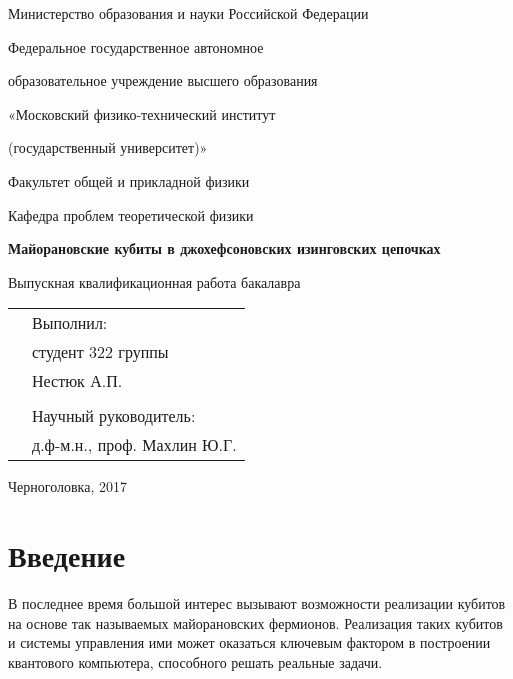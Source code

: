 \documentclass[a4paper,12pt]{article}
\author{}
\title{}
\date{\today}
\theoremstyle{plain} %
\theoremstyle{definition} %
\theoremstyle{remark} %
\begin{document}
    
\begin{titlepage}
    \begin{center}
        Министерство образования и науки Российской Федерации
        \linebreak
        
        Федеральное государственное автономное
        
        образовательное учреждение высшего образования 
        
        «Московский физико-технический институт 
        
        (государственный университет)»
        \linebreak
        
        Факультет общей и прикладной физики
        
        Кафедра проблем теоретической физики
        \vspace{160pt}
        
        \textbf{\LARGE Майорановские кубиты в джохефсоновских изинговских цепочках}
        \linebreak
        
        Выпускная квалификационная работа бакалавра
     \end{center}
     \vspace{110pt}
     
     \begin{flushright}
         \begin{tabular}{cl}
         &Выполнил:\\
         &студент 322 группы\\         
         &Нестюк А.П.\\
         &\\
         &Научный руководитель:\\
         &д.ф-м.н., проф. Махлин Ю.Г.
        \end{tabular}
    \end{flushright}
    \vspace{170pt}
    
    \begin{center}
        Черноголовка, 2017
    \end{center}
 \end{titlepage}   

\tableofcontents
\pagebreak

\section{Введение}
В последнее время большой интерес вызывают возможности реализации кубитов на основе так называемых майорановских фермионов. Реализация таких кубитов и системы управления ими может оказаться ключевым фактором в построении квантового компьютера, способного решать реальные задачи.
\end{document}
